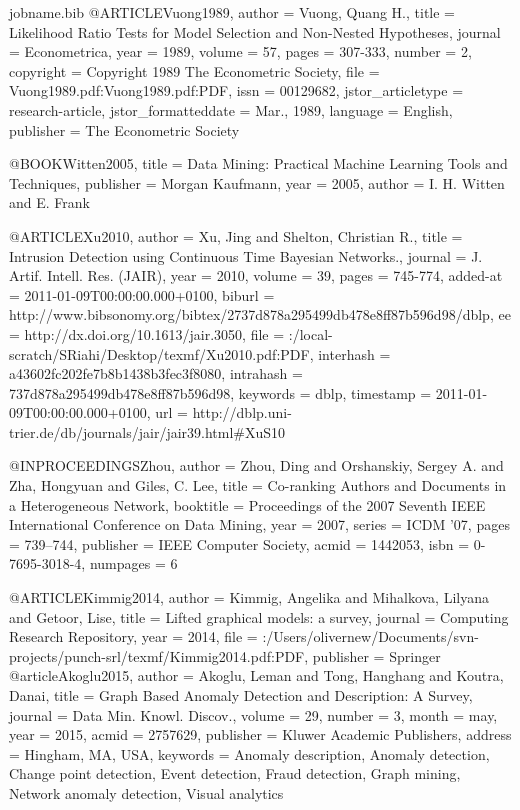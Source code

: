 {\begin{filecontents*}{jobname.bib}
	@ARTICLE{Vuong1989,
		author = {Vuong, Quang H.},
		title = {Likelihood Ratio Tests for Model Selection and Non-Nested Hypotheses},
		journal = {Econometrica},
		year = {1989},
		volume = {57},
		pages = {307-333},
		number = {2},
		copyright = {Copyright 1989 The Econometric Society},
		file = {Vuong1989.pdf:Vuong1989.pdf:PDF},
		issn = {00129682},
		jstor_articletype = {research-article},
		jstor_formatteddate = {Mar., 1989},
		language = {English},
		publisher = {The Econometric Society}
	}
	
	@BOOK{Witten2005,
		title = {Data Mining: Practical Machine Learning Tools and Techniques},
		publisher = {Morgan Kaufmann},
		year = {2005},
		author = {I. H. Witten and E. Frank}
	}
	
	@ARTICLE{Xu2010,
		author = {Xu, Jing and Shelton, Christian R.},
		title = {Intrusion Detection using Continuous Time Bayesian Networks.},
		journal = {J. Artif. Intell. Res. (JAIR)},
		year = {2010},
		volume = {39},
		pages = {745-774},
		added-at = {2011-01-09T00:00:00.000+0100},
		biburl = {http://www.bibsonomy.org/bibtex/2737d878a295499db478e8ff87b596d98/dblp},
		ee = {http://dx.doi.org/10.1613/jair.3050},
		file = {:/local-scratch/SRiahi/Desktop/texmf/Xu2010.pdf:PDF},
		interhash = {a43602fc202fe7b8b1438b3fec3f8080},
		intrahash = {737d878a295499db478e8ff87b596d98},
		keywords = {dblp},
		timestamp = {2011-01-09T00:00:00.000+0100},
		url = {http://dblp.uni-trier.de/db/journals/jair/jair39.html#XuS10}
	}
	
	@INPROCEEDINGS{Zhou,
		author = {Zhou, Ding and Orshanskiy, Sergey A. and Zha, Hongyuan and Giles,
			C. Lee},
		title = {Co-ranking Authors and Documents in a Heterogeneous Network},
		booktitle = {Proceedings of the 2007 Seventh IEEE International Conference on
			Data Mining},
		year = {2007},
		series = {ICDM '07},
		pages = {739--744},
		publisher = {IEEE Computer Society},
		acmid = {1442053},
		isbn = {0-7695-3018-4},
		numpages = {6}
	}
	
	@ARTICLE{Kimmig2014,
		author = {Kimmig, Angelika and Mihalkova, Lilyana and Getoor, Lise},
		title = {Lifted graphical models: a survey},
		journal = { Computing Research Repository},
		year = {2014},
		file = {:/Users/olivernew/Documents/svn-projects/punch-srl/texmf/Kimmig2014.pdf:PDF},
		publisher = {Springer}
	}
	@article{Akoglu2015,
		author = {Akoglu, Leman and Tong, Hanghang and Koutra, Danai},
		title = {Graph Based Anomaly Detection and Description: A Survey},
		journal = {Data Min. Knowl. Discov.},
		volume = {29},
		number = {3},
		month = may,
		year = {2015},
		acmid = {2757629},
		publisher = {Kluwer Academic Publishers},
		address = {Hingham, MA, USA},
		keywords = {Anomaly description, Anomaly detection, Change point detection, Event detection, Fraud detection, Graph mining, Network anomaly detection, Visual analytics}
	} 
	

\end{filecontents*}}
